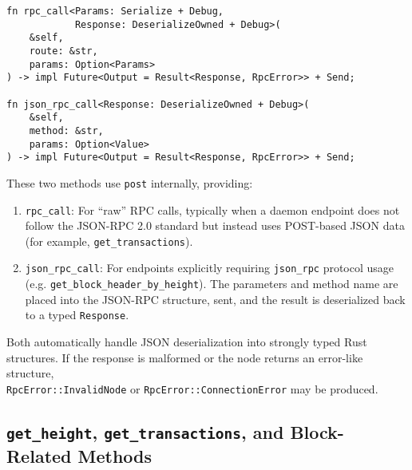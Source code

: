 \documentclass[12pt,a4paper]{article}
\begin{document}
\begin{verbatim}
fn rpc_call<Params: Serialize + Debug,
            Response: DeserializeOwned + Debug>(
    &self,
    route: &str,
    params: Option<Params>
) -> impl Future<Output = Result<Response, RpcError>> + Send;

fn json_rpc_call<Response: DeserializeOwned + Debug>(
    &self,
    method: &str,
    params: Option<Value>
) -> impl Future<Output = Result<Response, RpcError>> + Send;
\end{verbatim}

These two methods use \texttt{post} internally, providing:

\begin{enumerate}
    \item \texttt{rpc\_call}: For “raw” RPC calls, typically when a daemon
    endpoint does not follow the JSON-RPC 2.0 standard but instead uses
    POST-based JSON data (for example, \texttt{get\_transactions}).

    \item \texttt{json\_rpc\_call}: For endpoints explicitly requiring
    \texttt{json\_rpc} protocol usage (e.g. \texttt{get\_block\_header\_by\_height}).
    The parameters and method name are placed into the JSON-RPC structure, sent,
    and the result is deserialized back to a typed \texttt{Response}.
\end{enumerate}

Both automatically handle JSON deserialization into strongly typed Rust
structures.  If the response is malformed or the node returns an error-like
structure, \\ \texttt{RpcError::InvalidNode} or \texttt{RpcError::ConnectionError}
may be produced.

\subsection{\texttt{get\_height}, \texttt{get\_transactions}, and Block-Related Methods}
\end{document}
